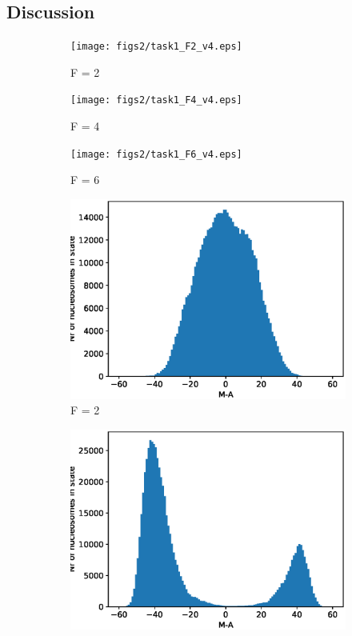 \documentclass{article}
\begin{document}
\subsection{Discussion}
\begin{figure}[H]
	\centering
	\begin{subfigure}[b]{.3\textwidth}
		\centering
		\texttt{[image: figs2/task1\_F2\_v4.eps]}
		\caption{F = 2}
		\label{fig:task1_F2}
	\end{subfigure}
	\begin{subfigure}[b]{.3\textwidth}
		\centering
		\texttt{[image: figs2/task1\_F4\_v4.eps]}
		\caption{F = 4}
		\label{fig:task1_F4}
	\end{subfigure}
	\begin{subfigure}[b]{.3\textwidth}
		\centering
		\texttt{[image: figs2/task1\_F6\_v4.eps]}
		\caption{F = 6}
		\label{fig:task1_F6}
	\end{subfigure}
	\begin{subfigure}[b]{.3\textwidth}
		\centering
		\includegraphics[width= \linewidth]{figs2/task1_F2_hist_v4.eps}
		\caption{F = 2}
		\label{fig:task1_F2_hist}
	\end{subfigure}
	\begin{subfigure}[b]{.3\textwidth}
		\centering
		\includegraphics[width= \linewidth]{figs2/task1_F4_hist_v4.eps}

\end{subfigure}
\end{figure}
\end{document}
